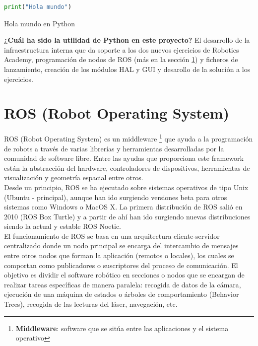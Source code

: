 \begin{code}[H]
\begin{lstlisting}[language=Python]
print("Hola mundo")
\end{lstlisting}
\caption[Hola mundo en Python]{Hola mundo en Python}
\label{cod:holamundo_python}
\end{code}

\textbf{¿Cuál ha sido la utilidad de Python en este proyecto?} El desarrollo de la infraestructura interna que da soporte a los dos nuevos ejercicios de Robotics Academy, programación de nodos de ROS (más en la sección \ref{sec:ros}) y ficheros de lanzamiento, creación de los módulos HAL y GUI y desarollo de la solución a los ejercicios.\\




\section{ROS (Robot Operating System)}
\label{sec:ros}
ROS (Robot Operating System) es un middleware \footnote{\textbf{Middleware}: software que se sitúa entre las aplicaciones y el sistema operativo} que ayuda a la programación de robots a través de varias librerías y herramientas desarrolladas por la comunidad de software libre. Entre las ayudas que proporciona este framework están la abstracción del hardware, controladores de dispositivos, herramientas de visualización y geometría espacial entre otros.\\

Desde un principio, ROS se ha ejecutado sobre sistemas operativos de tipo Unix (Ubuntu - principal), aunque han ido surgiendo versiones beta para otros sistemas como Windows o MacOS X. La primera distribución de ROS salió en 2010 (ROS Box Turtle) y a partir de ahí han ido surgiendo nuevas distribuciones siendo la actual y estable ROS Noetic.\\

El funcionamiento de ROS se basa en una arquitectura cliente-servidor centralizado donde un nodo principal se encarga del intercambio de mensajes entre otros nodos que forman la aplicación (remotos o locales), los cuales se comportan como publicadores o suscriptores del proceso de comunicación. El objetivo es dividir el software robótico en secciones o nodos que se encargan de realizar tareas específicas de manera paralela: recogida de datos de la cámara, ejecución de una máquina de estados o árboles de comportamiento (Behavior Trees), recogida de las lecturas del láser, navegación, etc.\\

